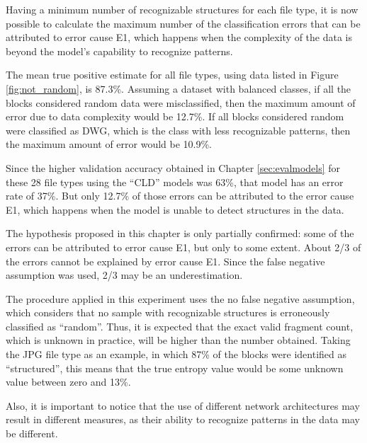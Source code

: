 Having a minimum number of recognizable structures for each file type, it is now possible to calculate the maximum number of the classification errors that can be attributed to error cause E1, which happens when the complexity of the data is beyond the model’s capability to recognize patterns.

The mean true positive estimate for all file types, using data listed in Figure \ref{fig:not_random}, is 87.3\%.  Assuming a dataset with balanced classes, if all the blocks considered random data were misclassified, then the maximum amount of error due to data complexity would be 12.7\%. If all blocks considered random were classified as DWG, which is the class with less recognizable patterns, then the maximum amount of error would be 10.9\%.

Since the higher validation accuracy obtained in Chapter \ref{sec:evalmodels} for these 28 file types using the ``CLD'' models was 63\%, that model has an error rate of 37\%. But only 12.7\% of those errors can be attributed to the error cause E1, which happens when the model is unable to detect structures in the data.

The hypothesis proposed in this chapter is only partially confirmed: some of the errors can be attributed to error cause E1, but only to some extent. About 2/3 of the errors cannot be explained by error cause E1. Since the false negative assumption was used, 2/3 may be an underestimation.


The procedure applied in this experiment uses the no false negative assumption, which considers that no sample with recognizable structures is erroneously classified as ``random''. Thus, it is expected that the exact valid fragment count, which is unknown in practice, will be higher than the number obtained. Taking the JPG file type as an example, in which 87\% of the blocks were identified as ``structured'', this means that the true entropy value would be some unknown value between zero and 13\%.

Also, it is important to notice that the use of different network architectures may result in different measures, as their ability to recognize patterns in the data may be different.

